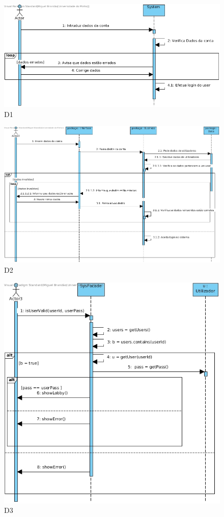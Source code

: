 \begin{figure}[H]
    \centering
    \includegraphics[width=\textwidth]{diagramas_de_sequencia/imgs/UserSystemUC1.jpg}
    \caption{D1}
\end{figure}
\begin{figure}[H]
    \centering
    \includegraphics[width=\textwidth]{diagramas_de_sequencia/imgs/UserSystemUC1D2.jpg}
    \caption{D2}
\end{figure}
\begin{figure}[H]
    \centering
    \includegraphics[width=\textwidth]{diagramas_de_sequencia/imgs/UserSystemUC1D3.jpg}
    \caption{D3}
\end{figure}

